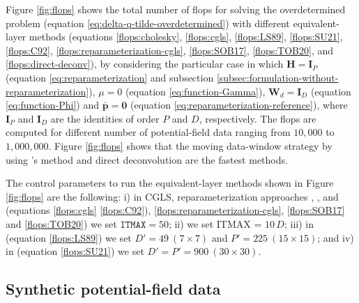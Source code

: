\documentclass[utf8]{FrontiersinHarvard} %
\begin{document}
	Figure \ref{fig:flops} shows the total number of flops for solving the overdetermined problem
	(equation \ref{eq:delta-q-tilde-overdetermined}) with different equivalent-layer methods
	(equations \ref{flops:cholesky}, \ref{flops:cgls}, \ref{flops:LS89}, \ref{flops:SU21}, 
	\ref{flops:C92}, \ref{flops:reparameterization-cgls}, \ref{flops:SOB17}, \ref{flops:TOB20},
	and \ref{flops:direct-deconv}), by considering 
	the particular case in which $\mathbf{H} = \mathbf{I}_{P}$ (equation \ref{eq:reparameterization} and 
	subsection \ref{subsec:formulation-without-reparameterization}),
	$\mu = 0$ (equation \ref{eq:function-Gamma}), 
	$\mathbf{W}_{d} = \mathbf{I}_{D}$ (equation \ref{eq:function-Phi}) and
	$\bar{\mathbf{p}} = \mathbf{0}$ (equation \ref{eq:reparameterization-reference}), 
	where $\mathbf{I}_{P}$ and $\mathbf{I}_{D}$ are the identities of order $P$ and $D$, respectively.
	The flops are computed for different number of potential-field data ranging from $10,000$ to $1,000,000$.
	Figure \ref{fig:flops} shows that the moving data-window strategy by using 
	\citeauthor{leao-silva1989}'s \citeyear{leao-silva1989} method and direct deconvolution are the fastest methods.
	
	The control parameters to run the equivalent-layer methods shown in Figure 
	\ref{fig:flops}  are the following: 
	i) in CGLS, reparameterization approaches \cite[e.g.,][]{oliveirajr-etal2013, mendonca2020}, \cite{siqueira-etal2017}, and 
	\cite{takahashi-etal2020} (equations \ref{flops:cgls} \ref{flops:C92}), 
	\ref{flops:reparameterization-cgls},  \ref{flops:SOB17} and \ref{flops:TOB20}) we set $\mathtt{ITMAX} = 50$; 
	ii) \cite{cordell1992} we set ITMAX = $10 \, D$; 
	iii) in \cite{leao-silva1989} (equation \ref{flops:LS89}) we set 
	$D'= 49 \: (7 \times 7)$ and $P' = 225 \: (15 \times 15) $; and
	iv) in \cite{soler-uieda2021} (equation  \ref{flops:SU21}) we set 
	$D'= P' = 900 \: (30 \times 30)$.
	
	\subsection{Synthetic potential-field data}
	\label{subsec:synthetic-data}
	
\end{document}

